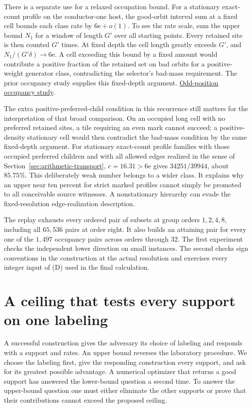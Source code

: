 \documentclass[12pt,letterpaper]{article}
\begin{document}
There is a separate use for a relaxed occupation bound. For a stationary exact-count profile on the conductor-one host, the good-orbit interval sum at a fixed cell bounds each class rate by \(6\mathrm e+o(1)\). To see the rate scale, sum the upper bound \(N_1\) for a window of length \(G'\) over all starting points. Every retained site is then counted \(G'\) times. At fixed depth the cell length greatly exceeds \(G'\), and \(N_1/(G'\delta)\to6\mathrm e\). A cell exceeding this bound by a fixed amount would contribute a positive fraction of the retained set on bad orbits for a positive-weight generator class, contradicting the selector's bad-mass requirement. The prior occupancy study supplies this fixed-depth argument. \href{https://github.com/nousentllc/riemann-hypothesis/pull/10}{Odd-position occupancy study}.

The extra positive-preferred-child condition in this recurrence still matters for the interpretation of that broad comparison. On an occupied long cell with no preferred retained sites, a tile requiring an even mark cannot succeed; a positive-density stationary cell would then contradict the bad-mass condition by the same fixed-depth argument. For stationary exact-count profile families with those occupied preferred children and with all allowed edges realized in the sense of Section~\ref{sec:arithmetic-transport}, \(c=16.31>6\mathrm e\) gives \(34251/39944\), about \(85.75\%\). This deliberately weak number belongs to a wider class. It explains why an upper near ten percent for strict marked profiles cannot simply be promoted to all conceivable source witnesses. A nonstationary hierarchy can evade the fixed-resolution edge-realization description.

The replay exhausts every ordered pair of subsets at group orders \(1,2,4,8\), including all \(65{,}536\) pairs at order eight. It also builds an attaining pair for every one of the \(1{,}497\) occupancy pairs across orders through 32. The first experiment checks the independent lower direction on small instances. The second checks sign conventions in the construction at the actual resolution and exercises every integer input of (D) used in the final calculation.
\section{A ceiling that tests every support on one labeling}
\label{sec:closed-box-oracle}

A successful construction gives the adversary its choice of labeling and responds with a support and rates. An upper bound reverses the laboratory procedure. We choose the labeling first, give the responding construction every support, and ask for its greatest possible advantage. A numerical optimizer that returns a good support has answered the lower-bound question a second time. To answer the upper-bound question one must either eliminate the other supports or prove that their contributions cannot exceed the proposed ceiling.
\end{document}
